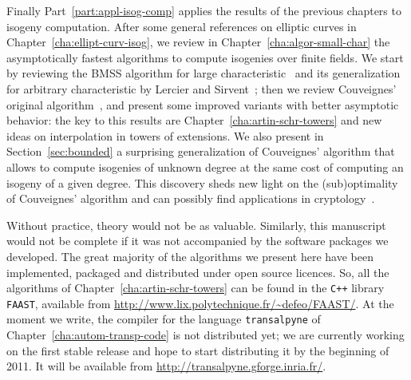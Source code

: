 Finally Part~\ref{part:appl-isog-comp} applies the results of the
previous chapters to isogeny computation. After some general
references on elliptic curves in Chapter~\ref{cha:ellipt-curv-isog},
we review in Chapter~\ref{cha:algor-small-char} the asymptotically
fastest algorithms to compute isogenies over finite fields.  We start
by reviewing the BMSS algorithm for large
characteristic~\cite{bostan+morain+salvy+schost08} and its
generalization for arbitrary characteristic by Lercier and
Sirvent~\cite{lercier+sirvent08}; then we review Couveignes' original
algorithm~\cite{couveignes96}, and present some improved variants with
better asymptotic behavior: the key to this results are
Chapter~\ref{cha:artin-schr-towers} and new ideas on interpolation in
towers of extensions.  We also present in Section~\ref{sec:bounded} a
surprising generalization of Couveignes' algorithm that allows to
compute isogenies of unknown degree at the same cost of computing an
isogeny of a given degree.  This discovery sheds new light on the
(sub)optimality of Couveignes' algorithm and can possibly find
applications in
cryptology~\cite{gaudry+hess+smart02,GHS,hess03,teske06}.

Without practice, theory would not be as valuable. Similarly, this
manuscript would not be complete if it was not accompanied by the
software packages we developed. The great majority of the algorithms
we present here have been implemented, packaged and distributed under
open source licences. So, all the algorithms of
Chapter~\ref{cha:artin-schr-towers} can be found in the \texttt{C++}
library \texttt{FAAST}, available from
\url{http://www.lix.polytechnique.fr/~defeo/FAAST/}. At the moment we
write, the compiler for the language \texttt{transalpyne} of
Chapter~\ref{cha:autom-transp-code} is not distributed yet; we are
currently working on the first stable release and hope to start
distributing it by the beginning of 2011. It will be available from
\url{ http://transalpyne.gforge.inria.fr/}.




